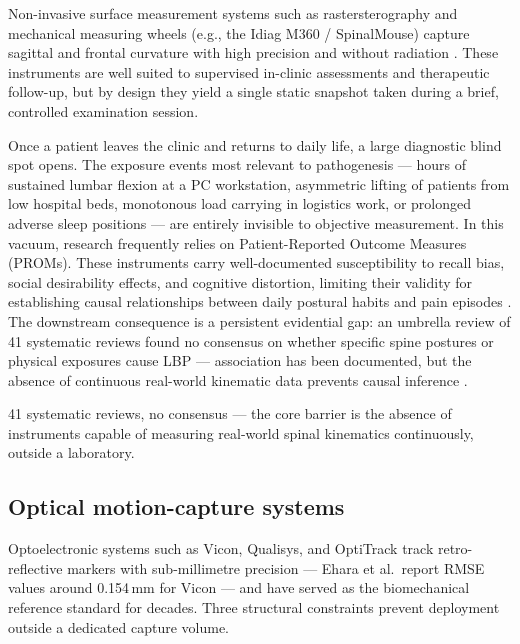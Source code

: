 Non-invasive surface measurement systems such as rastersterography and mechanical
measuring wheels (e.g., the Idiag M360 / SpinalMouse) capture sagittal and frontal
curvature with high precision and without radiation \cite{spinalMouse}.
These instruments are well suited to supervised in-clinic assessments and therapeutic
follow-up, but by design they yield a single static snapshot taken during a brief,
controlled examination session.

Once a patient leaves the clinic and returns to daily life, a large diagnostic blind
spot opens.
The exposure events most relevant to pathogenesis --- hours of sustained lumbar flexion
at a PC workstation, asymmetric lifting of patients from low hospital beds, monotonous
load carrying in logistics work, or prolonged adverse sleep positions --- are entirely
invisible to objective measurement.
In this vacuum, research frequently relies on Patient-Reported Outcome Measures
(\acp{PROM}).
These instruments carry well-documented susceptibility to recall bias, social
desirability effects, and cognitive distortion, limiting their validity for
establishing causal relationships between daily postural habits and pain
episodes \cite{natarajan2023}.
The downstream consequence is a persistent evidential gap: an umbrella review of
41 systematic reviews found no consensus on whether specific spine postures or
physical exposures cause \ac{LBP} --- association has been documented, but the
absence of continuous real-world kinematic data prevents causal inference
\cite{swain2020}.

\begin{factboxlavender}
    41 systematic reviews, no consensus --- the core barrier is the absence of
    instruments capable of measuring real-world spinal kinematics continuously,
    outside a laboratory.
\end{factboxlavender}

\subsection{Optical motion-capture systems}

Optoelectronic systems such as Vicon, Qualisys, and OptiTrack track retro-reflective
markers with sub-millimetre precision --- Ehara et al.\ report RMSE values around
0.154\,mm for Vicon \cite{vicon_rmse} --- and have served as the biomechanical reference
standard for decades.
Three structural constraints prevent deployment outside a dedicated capture volume.

